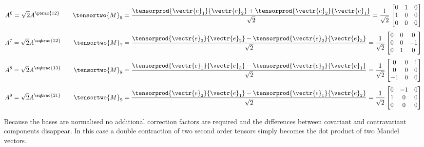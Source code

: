 \begin{equation}
  A^{6}=\sqrt{2}A^{\pbrac{12}} \qquad
  \tensortwo{M}_{6}=\dfrac{\tensorprod{\vectr{e}_{1}}{\vectr{e}_{2}}+\tensorprod{\vectr{e}_{2}}{\vectr{e}_{1}}}{\sqrt{2}}=
  \dfrac{1}{\sqrt{2}}\begin{bmatrix}
    0 & 1 & 0 \\
    1 & 0 & 0 \\
    0 & 0 & 0
  \end{bmatrix}
\end{equation}
\begin{equation}
  A^{7}=\sqrt{2}A^{\sqbrac{32}} \qquad
  \tensortwo{M}_{7}=\dfrac{\tensorprod{\vectr{e}_{3}}{\vectr{e}_{2}}-\tensorprod{\vectr{e}_{2}}{\vectr{e}_{3}}}{\sqrt{2}}=
  \dfrac{1}{\sqrt{2}}\begin{bmatrix}
    0 & 0 & 0 \\
    0 & 0 & -1 \\
    0 & 1 & 0
  \end{bmatrix}
\end{equation}
\begin{equation}
  A^{8}=\sqrt{2}A^{\sqbrac{13}} \qquad
  \tensortwo{M}_{8}=\dfrac{\tensorprod{\vectr{e}_{1}}{\vectr{e}_{3}}-\tensorprod{\vectr{e}_{3}}{\vectr{e}_{1}}}{\sqrt{2}}=
  \dfrac{1}{\sqrt{2}}\begin{bmatrix}
    0 & 0 & 1 \\
    0 & 0 & 0 \\
    -1 & 0 & 0
  \end{bmatrix}
\end{equation}
\begin{equation}
  A^{9}=\sqrt{2}A^{\sqbrac{21}} \qquad
  \tensortwo{M}_{9}=\dfrac{\tensorprod{\vectr{e}_{2}}{\vectr{e}_{1}}-\tensorprod{\vectr{e}_{1}}{\vectr{e}_{2}}}{\sqrt{2}}=
  \dfrac{1}{\sqrt{2}}\begin{bmatrix}
    0 & -1 & 0 \\
    1 & 0 & 0 \\
    0 & 0 & 0
  \end{bmatrix}
\end{equation}

Because the bases are normalised no additional correction factors are
required and the differences between covariant and contravariant
components disappear. In this case a double contraction of two second
order tensors simply becomes the dot product of two Mandel vectors.

